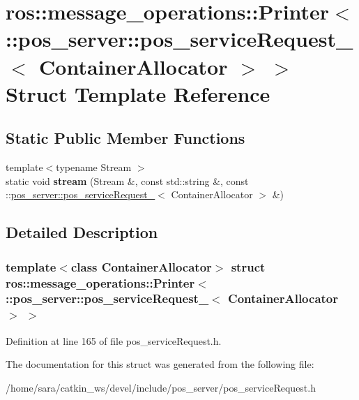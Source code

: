 \hypertarget{structros_1_1message__operations_1_1Printer_3_01_1_1pos__server_1_1pos__serviceRequest___3_01ContainerAllocator_01_4_01_4}{}\section{ros\+:\+:message\+\_\+operations\+:\+:Printer$<$ \+:\+:pos\+\_\+server\+:\+:pos\+\_\+service\+Request\+\_\+$<$ Container\+Allocator $>$ $>$ Struct Template Reference}
\label{structros_1_1message__operations_1_1Printer_3_01_1_1pos__server_1_1pos__serviceRequest___3_01ContainerAllocator_01_4_01_4}
\subsection*{Static Public Member Functions}
\begin{DoxyCompactItemize}
\item 
\mbox{\label{structros_1_1message__operations_1_1Printer_3_01_1_1pos__server_1_1pos__serviceRequest___3_01ContainerAllocator_01_4_01_4_a67174a0cec4961b6f7f939f2f35ff810}} 
{\footnotesize template$<$typename Stream $>$ }\\static void {\bfseries stream} (Stream \&, const std\+::string \&, const \+::\hyperlink{structpos__server_1_1pos__serviceRequest__}{pos\+\_\+server\+::pos\+\_\+service\+Request\+\_\+}$<$ Container\+Allocator $>$ \&)
\end{DoxyCompactItemize}


\subsection{Detailed Description}
\subsubsection*{template$<$class Container\+Allocator$>$\newline
struct ros\+::message\+\_\+operations\+::\+Printer$<$ \+::pos\+\_\+server\+::pos\+\_\+service\+Request\+\_\+$<$ Container\+Allocator $>$ $>$}



Definition at line 165 of file pos\+\_\+service\+Request.\+h.



The documentation for this struct was generated from the following file\+:\begin{DoxyCompactItemize}
\item 
/home/sara/catkin\+\_\+ws/devel/include/pos\+\_\+server/pos\+\_\+service\+Request.\+h\end{DoxyCompactItemize}
